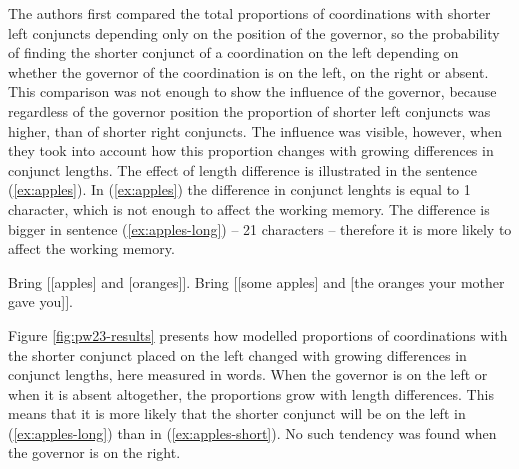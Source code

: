 The authors first compared the total proportions of coordinations with shorter left conjuncts depending only on the position of the governor, so the probability of finding the shorter conjunct of a coordination on the left depending on whether the governor of the coordination is on the left, on the right or absent. This comparison was not enough to show the influence of the governor, because regardless of the governor position the proportion of shorter left conjuncts was higher, than of shorter right conjuncts. The influence was visible, however, when they took into account how this proportion changes with growing differences in conjunct lengths. The effect of length difference is illustrated in the sentence (\ref{ex:apples}). In (\ref{ex:apples}) the difference in conjunct lenghts is equal to 1 character, which is not enough to affect the working memory. The difference is bigger in sentence (\ref{ex:apples-long}) -- 21 characters -- therefore it is more likely to affect the working memory.

\begin{exe}
    \ex\label{ex:apples}
    \begin{xlist}
    \ex\label{ex:apples-short}
    Bring $\Bigr[$[apples] and [oranges]$\Bigr]$.
    \ex\label{ex:apples-long}
    Bring $\Bigr[$[some apples] and [the oranges your mother gave you]$\Bigr]$.
    \end{xlist}
\end{exe}

Figure \ref{fig:pw23-results} presents how modelled proportions of coordinations with the shorter conjunct placed on the left changed with growing differences in conjunct lengths, here measured in words. When the governor is on the left or when it is absent altogether, the proportions grow with length differences. This means that it is more likely that the shorter conjunct will be on the left in (\ref{ex:apples-long}) than in (\ref{ex:apples-short}). No such tendency was found when the governor is on the right. 

